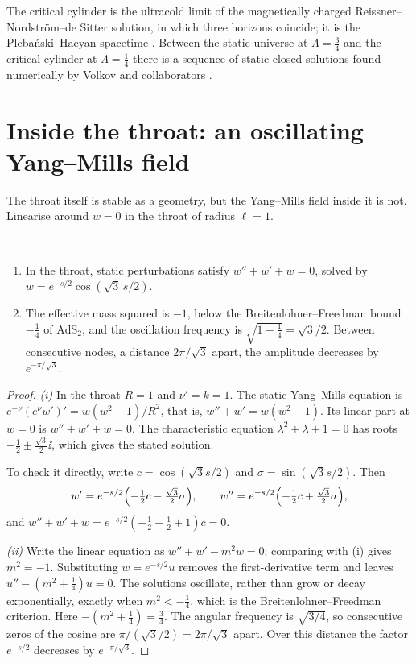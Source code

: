 The critical cylinder is the ultracold limit of the magnetically charged Reissner--Nordstr\"om--de Sitter solution, in which three horizons coincide; it is the Plebański--Hacyan spacetime \cite{PlebanskiHacyan1979}. Between the static universe at $\Lambda=\frac34$ and the critical cylinder at $\Lambda=\frac14$ there is a sequence of static closed solutions found numerically by Volkov and collaborators \cite{Volkov1996} \ext.

\section{Inside the throat: an oscillating Yang--Mills field}

The throat itself is stable as a geometry, but the Yang--Mills field inside it is not. Linearise around $w=0$ in the throat of radius $\ell=1$.

\begin{theorem}\label{thm:throatmode}\ver\
\begin{enumerate}[label=(\roman*)]
\item In the throat, static perturbations satisfy $w''+w'+w=0$, solved by $w=e^{-s/2}\cos(\sqrt3\,s/2)$.
\item The effective mass squared is $-1$, below the Breitenlohner--Freedman bound $-\frac14$ of $\mathrm{AdS}_2$, and the oscillation frequency is $\sqrt{1-\frac14}=\sqrt3/2$. Between consecutive nodes, a distance $2\pi/\sqrt3$ apart, the amplitude decreases by $e^{-\pi/\sqrt3}$.
\end{enumerate}
\end{theorem}
\begin{proof}
\emph{(i)} In the throat $R=1$ and $\nu'=k=1$. The static Yang--Mills equation is $e^{-\nu}(e^\nu w')'=w(w^2-1)/R^2$, that is, $w''+w'=w(w^2-1)$. Its linear part at $w=0$ is $w''+w'+w=0$. The characteristic equation $\lambda^2+\lambda+1=0$ has roots $-\frac12\pm\frac{\sqrt3}2\ii$, which gives the stated solution.

To check it directly, write $c=\cos(\sqrt3s/2)$ and $\sigma=\sin(\sqrt3s/2)$. Then
\[
w'=e^{-s/2}\Bigl(-\tfrac12c-\tfrac{\sqrt3}2\sigma\Bigr),\qquad w''=e^{-s/2}\Bigl(-\tfrac12c+\tfrac{\sqrt3}2\sigma\Bigr),
\]
and $w''+w'+w=e^{-s/2}(-\frac12-\frac12+1)c=0$.

\emph{(ii)} Write the linear equation as $w''+w'-m^2w=0$; comparing with (i) gives $m^2=-1$. Substituting $w=e^{-s/2}u$ removes the first-derivative term and leaves $u''-(m^2+\frac14)u=0$. The solutions oscillate, rather than grow or decay exponentially, exactly when $m^2<-\frac14$, which is the Breitenlohner--Freedman criterion. Here $-(m^2+\frac14)=\frac34$. The angular frequency is $\sqrt{3/4}$, so consecutive zeros of the cosine are $\pi/(\sqrt3/2)=2\pi/\sqrt3$ apart. Over this distance the factor $e^{-s/2}$ decreases by $e^{-\pi/\sqrt3}$.
\end{proof}


